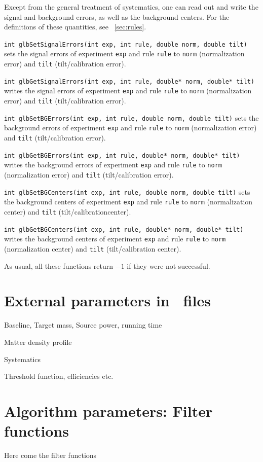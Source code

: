 Except from the general treatment of systematics, one can read out
and write the signal and background errors, as well as the background
centers. For the definitions of these quantities, see \Sec~\ref{sec:rules}.
\begin{function}
{\tt int glbSetSignalErrors(int exp, int rule, double norm, double tilt)}
sets the signal errors of experiment {\tt exp} and rule {\tt rule}
to {\tt norm} (normalization error) and {\tt tilt} (tilt/calibration error).
\end{function}
\begin{function}
{\tt int glbGetSignalErrors(int exp, int rule, double* norm, double* tilt)}
writes the signal errors of experiment {\tt exp} and rule {\tt rule}
to {\tt norm} (normalization error) and {\tt tilt} (tilt/calibration error).
\end{function}
\begin{function}
{\tt int glbSetBGErrors(int exp, int rule, double norm, double tilt)}
sets the background errors of experiment {\tt exp} and rule {\tt rule}
to {\tt norm} (normalization error) and {\tt tilt} (tilt/calibration error).
\end{function}
\begin{function}
{\tt int glbGetBGErrors(int exp, int rule, double* norm, double* tilt)}
writes the background errors of experiment {\tt exp} and rule {\tt rule}
to {\tt norm} (normalization error) and {\tt tilt} (tilt/calibration error).
\end{function}
\begin{function}
{\tt int glbSetBGCenters(int exp, int rule, double norm, double tilt)}
sets the background centers of experiment {\tt exp} and rule {\tt rule}
to {\tt norm} (normalization center) and {\tt tilt} (tilt/calibrationcenter).
\end{function}
\begin{function}
{\tt int glbGetBGCenters(int exp, int rule, double* norm, double* tilt)}
writes the background centers of experiment {\tt exp} and rule {\tt rule}
to {\tt norm} (normalization center) and {\tt tilt} (tilt/calibration center).
\end{function}
As usual, all these functions return $-1$ if they were not successful.

\section{External parameters in \AEDL\ files}
\label{sec:aedlparams}

\bi
\item
 Baseline, Target mass, Source power, running time
\item
 Matter density profile
\item
 Systematics
\item
 Threshold function, efficiencies etc.
\ei

\section{Algorithm parameters: Filter functions}

Here come the filter functions